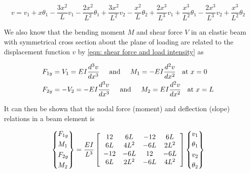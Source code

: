 \documentclass[a4paper,openany,12pt]{book}
\begin{document}
{{$$v = v_1 + x\theta_1 - \frac{3x^2}{L}v_1 - \frac{2x^2}{L^2}\theta_1 + \frac{3x^2}{L^2}v_2 - \frac{x^2}{L}\theta_2 + \frac{2x^3}{L^3}v_1 + \frac{x^3}{L^2}\theta_1 - \frac{2x^3}{L^3}v_2 + \frac{x^3}{L^2}\theta_2$$

We also know that the bending moment \(M\) and shear force \(V\) in an
elastic beam with symmetrical cross section about the plane of loading
are related to the displacement function \(v\) by
\ref{eqn: shear force and load intensity}
as

$$\begin{gathered}
  F_{1y} = V_1 = EI\frac{d^3v}{dx^3} \hspace{0.5cm} \text{and} \hspace{0.5cm}
  M_1 =  -EI\frac{d^2v}{dx^2} \hspace{0.2cm} \text{ at }x = 0 \hfill \\
  F_{2y} =  -V_2 =  - EI\frac{d^3v}{dx^3} \hspace{0.5cm} \text{and}
  \hspace{0.5cm} M_2 = EI\frac{d^2v}{dx^2} \hspace{0.2cm} \text{ at }x = L \hfill \\ \end{gathered}$$

It can then be shown that the nodal force (moment) and deflection
(slope) relations in a beam element is

\begin{gather*}
  \left\{ \begin{gathered}
      F_{1y} \hfill \\
      M_1 \hfill \\
      F_{2y} \hfill \\
      M_2 \hfill \\ 
    \end{gathered}
  \right\} = \frac{EI}{L^3}
  \left[
    \begin{array}{*{20}{c}}
      12&6L&-12&6L \\ 
      6L&4L^2&-6L&2L^2 \\ 
      -12&-6L&12&-6L \\ 
      6L&2L^2&-6L&4L^2 
    \end{array}
  \right]
  \left\{
    \begin{gathered}
      v_1 \hfill \\
      \theta _1 \hfill \\
      v_2 \hfill \\
      \theta _2 \hfill \\ 
    \end{gathered}
  \right\}
\end{gather*}

}}
\end{document}
